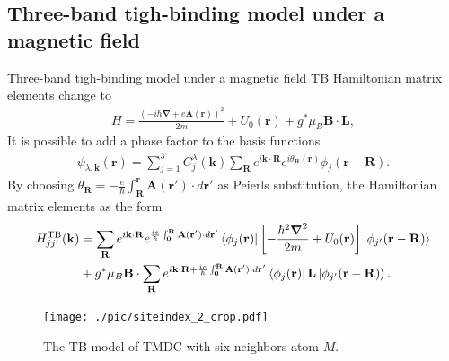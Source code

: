 \documentclass[aspectratio=169,compress,x11names]{beamer}
\begin{document}
	\subsection{Three-band tigh-binding model under a magnetic field}
	\begin{frame}{Three-band tigh-binding model under a magnetic field}
		TB Hamiltonian matrix elements change to
		\begin{gather}
			H= \frac{(-i \hbar \boldsymbol{\nabla} + e \mathbf{A}(\mathbf{r}))^{2}}{2m} + U_{0}(\mathbf{r}) + g^{*} \mu_{B} \mathbf{B} \cdot \mathbf{L},
		\end{gather}
		It is possible to add a phase factor to the basis functions
		\begin{gather}
			\psi_{\lambda,\mathbf{k}}(\mathbf{r}) = \sum_{j=1}^{3} C_{j}^{\lambda}(\mathbf{k}) \sum_{\mathbf{R}} e^{i \mathbf{k} \cdot \mathbf{R} } e^{i\theta_\mathbf{R}(\mathbf{r})} \phi_{j}(\mathbf{r} - \mathbf{R}).
		\end{gather}
		By choosing $\theta_\mathbf{R} = - \tfrac{e}{\hbar} \int_{\mathbf{R}}^{\mathbf{r}} \mathbf{A}(\mathbf{r'}) \cdot d\mathbf{r}' $ as Peierls substitution, the Hamiltonian matrix elements as the form
		\begin{equation}
			\begin{aligned}
				H_{jj'}^{\text{TB}}(\mathbf{k})
				&= \sum_{\mathbf{R}} e^{i\mathbf{k \cdot R}} e^{\frac{ie}{\hbar} \int_{\mathbf{0}}^{\mathbf{R}} \mathbf{A(\mathbf{r'})} \cdot d \mathbf{r'} } \bra{\phi_{j}(\mathbf{r})} \left[ -\frac{\hbar^{2} \boldsymbol{\nabla}^{2}}{2m} + U_{0} (\mathbf{r}) \right] \ket{\phi_{j'}(\mathbf{r - R})} \\
				&+ g^{*} \mu_{B} \mathbf{B} \cdot \sum_{\mathbf{R}} e^{i\mathbf{k \cdot R} + \frac{ie}{\hbar} \int_{\mathbf{0}}^{\mathbf{R}} \mathbf{A(\mathbf{r'})} \cdot d\mathbf{r'} } \bra{\phi_{j}(\mathbf{r})} \mathbf{L} \ket{\phi_{j'}(\mathbf{r - R})}.
			\end{aligned}
		\end{equation}
	\end{frame}
	\begin{frame}
		\begin{figure}
			\centering
			\texttt{[image: ./pic/siteindex\_2\_crop.pdf]}
			\caption{\label{fig:site index} The TB model of TMDC with six neighbors atom $M$.}
		\end{figure}
	\end{frame}
\end{document}
